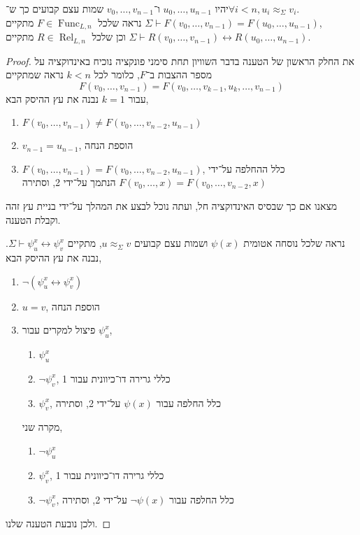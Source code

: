 \subquestion{}
יהיו $u_0, \dots, u_{n - 1}$ ו־$v_0, \dots, v_{n - 1}$ שמות עצם קבועים כך ש־$\forall i < n, u_i \approx_\Sigma v_i$. \\
נראה שלכל $F \in \operatorname{Func}_{L, n}$ מתקיים $\Sigma \vdash F(v_0, \dots, v_{n - 1}) = F(u_0, \dots, u_{n - 1})$, \\
וכן שלכל $R \in \operatorname{Rel}_{L, n}$ מתקיים $\Sigma \vdash R(v_0, \dots, v_{n - 1}) \leftrightarrow R(u_0, \dots, u_{n - 1})$.
\begin{proof}
	את החלק הראשון של הטענה בדבר השוויון תחת סימני פונקציה נוכיח באינדוקציה על מספר ההצבות ב־$F$, כלומר לכל $k < n$ נראה שמתקיים
	\[
		F(v_0, \dots, v_{n - 1}) = F(v_0, \dots, v_{k - 1}, u_k, \dots, v_{n - 1})
	\]
	עבור $k = 1$ נבנה את עץ ההיסק הבא,
	\begin{enumerate}
		\item $F(v_0, \dots, v_{n - 1}) \ne F(v_0, \dots, v_{n - 2}, u_{n - 1})$
		\item $v_{n - 1} = u_{n - 1}$, הוספת הנחה
		\item $F(v_0, \dots, v_{n - 1}) = F(v_0, \dots, v_{n - 2}, u_{n - 1})$, כלל ההחלפה על־ידי $F(v_0, \dots, x) = F(v_0, \dots, v_{n - 2}, x)$ הנתמך על־ידי 2, וסתירה
	\end{enumerate}
	מצאנו אם כך שבסיס האינדוקציה חל, ועתה נוכל לבצע את המהלך על־ידי בניית עץ זהה וקבלת הטענה.

	נראה שלכל נוסחה אטומית $\psi(x)$ ושמות עצם קבועים $u \approx_\Sigma v$, מתקיים $\Sigma \vdash \psi_u^x \leftrightarrow \psi_v^x$.
	נבנה את עץ ההיסק הבא,
	\begin{enumerate}
		\item $\lnot (\psi_u^x \leftrightarrow \psi_v^x)$
		\item $u = v$, הוספת הנחה
		\item פיצול למקרים עבור $\psi_u^x$,
			\begin{enumerate}
				\item $\psi_u^x$
				\item $\lnot \psi_v^x$, כללי גרירה דו־כיוונית עבור 1
				\item $\psi_v^x$, כלל החלפה עבור $\psi(x)$ על־ידי 2, וסתירה
			\end{enumerate}
			מקרה שני,
			\begin{enumerate}
				\item $\lnot \psi_u^x$
				\item $\psi_v^x$, כללי גרירה דו־כיוונית עבור 1
				\item $\lnot \psi_v^x$, כלל החלפה עבור $\lnot \psi(x)$ על־ידי 2, וסתירה
			\end{enumerate}
	\end{enumerate}
	ולכן נובעת הטענה שלנו.


\end{proof}
